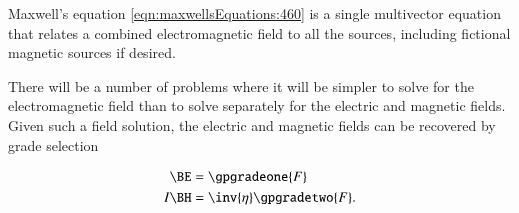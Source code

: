 Maxwell's equation \cref{eqn:maxwellsEquations:460} is a 
single multivector equation that relates a combined electromagnetic field to all the sources, including fictional magnetic sources if desired.  

There will be a number of problems where it will be simpler to solve for the electromagnetic field than to solve separately for the electric and magnetic fields.  Given such a field solution, the electric and magnetic fields can be recovered by grade selection 

\begin{dmath}\label{eqn:isotropicMaxwells:n}
\begin{aligned}
\BE &= \gpgradeone{F} \\
I \BH &= \inv{\eta} \gpgradetwo{F}.
\end{aligned}
\end{dmath}


